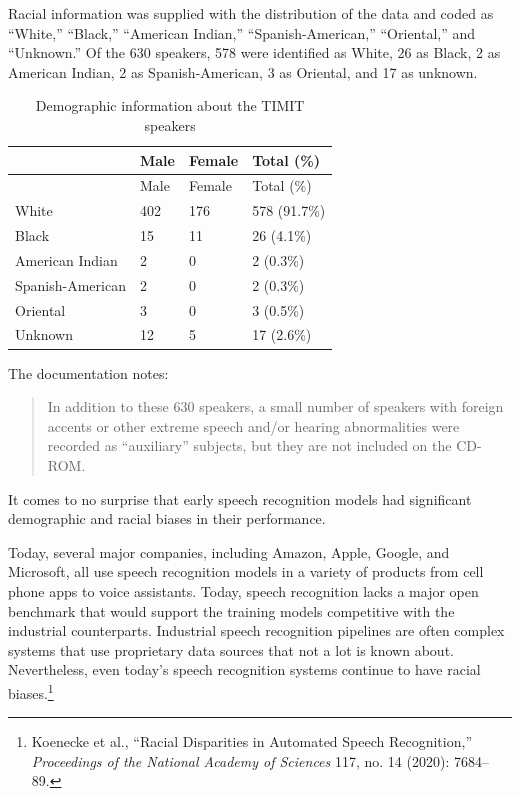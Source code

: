 \documentclass{tufte-book}
\begin{document}
Racial information was supplied with the distribution of the data and
coded as ``White,'' ``Black,'' ``American Indian,''
``Spanish-American,'' ``Oriental,'' and ``Unknown.'' Of the 630
speakers, 578 were identified as White, 26 as Black, 2 as American
Indian, 2 as Spanish-American, 3 as Oriental, and 17 as unknown.

\begin{longtable}[]{@{}llll@{}}
\caption{Demographic information about the TIMIT
speakers}\tabularnewline
\toprule
& Male & Female & Total (\%) \\
\midrule
\endfirsthead
\toprule
& Male & Female & Total (\%) \\
\midrule
\endhead
White & 402 & 176 & 578 (91.7\%) \\
Black & 15 & 11 & 26 (4.1\%) \\
American Indian & 2 & 0 & 2 (0.3\%) \\
Spanish-American & 2 & 0 & 2 (0.3\%) \\
Oriental & 3 & 0 & 3 (0.5\%) \\
Unknown & 12 & 5 & 17 (2.6\%) \\
\bottomrule
\end{longtable}

The documentation notes:

\begin{quote}
In addition to these 630 speakers, a small number of speakers with
foreign accents or other extreme speech and/or hearing abnormalities
were recorded as ``auxiliary'' subjects, but they are not included on
the CD-ROM.
\end{quote}

It comes to no surprise that early speech recognition models had
significant demographic and racial biases in their performance.

Today, several major companies, including Amazon, Apple, Google, and
Microsoft, all use speech recognition models in a variety of products
from cell phone apps to voice assistants. Today, speech recognition
lacks a major open benchmark that would support the training models
competitive with the industrial counterparts. Industrial speech
recognition pipelines are often complex systems that use proprietary
data sources that not a lot is known about. Nevertheless, even today's
speech recognition systems continue to have racial biases.\footnote{Koenecke
  et al., {``Racial Disparities in Automated Speech Recognition,''}
  \emph{Proceedings of the National Academy of Sciences} 117, no. 14
  (2020): 7684--89.}
\end{document}
